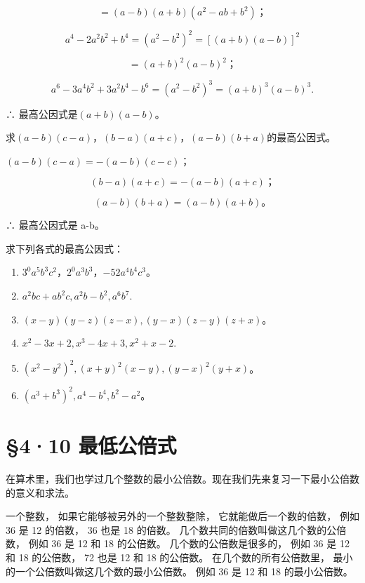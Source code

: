 \[
= (a - b) (a + b) \left(a ^{2} - a b + b ^{2}\right)\text{；}
\]

\[
a ^{4} - 2 a ^{2} b ^{2} + b ^{4} = (a ^{2} - b ^{2}) ^{2} = [ (a + b) (a - b) ] ^{2}
\]

\[
= (a + b) ^{2} (a - b) ^{2}\text{；}
\]

\[
a ^{6} - 3 a ^{4} b ^{2} + 3 a ^{2} b ^{4} - b ^{6} = (a ^{2} - b ^{2}) ^{3} = (a + b) ^{3} (a - b) ^{3}.
\]

∴ 最高公因式是\((a+b)(a-b)\)。

求\((a-b)(c-a)\)，\((b-a)(a+c)\)，\((a-b)(b+a)\)的最高公因式。

\((a - b)(c - a) = -(a - b)(c - c)\)；

\[
(b - a) (a + c) = - (a - b) (a + c)\text{；}
\]

\[
(a - b) (b + a) = (a - b) (a + b)\text{。}
\]

∴ 最高公因式是 a-b。

求下列各式的最高公因式：

\begin{enumerate}[start=1]
\item
  \(3^{0}a^{5}b^{3}c^{2}\)，\(2^{0}a^{3}b^{3}\)，\(-52a^{4}b^{4}c^{3}\)。
\item
  \(a^2 bc + ab^2 c, a^2 b - b^2, a^6 b^7.\)
\item
  \((x - y)(y - z)(z - x), (y - x)(z - y)(z + x)\)。
\item
  \(x^{2} - 3x + 2, x^{3} - 4x + 3, x^{2} + x - 2.\)
\item
  \((x^{2} - y^{2})^{2}, (x + y)^{2}(x - y), (y - x)^{2}(y + x)\)。
\item
  \((a^3 + b^3)^2, a^4 - b^4, b^2 - a^2\)。
\end{enumerate}

\section{§4·10 最低公倍式}

在算术里，我们也学过几个整数的最小公倍数。现在我们先来复习一下最小公倍数的意义和求法。

一个整数， 如果它能够被另外的一个整数整除， 它就能做后一个数的倍数，
例如 36 是 12 的倍数， 36 也是 18 的倍数。
几个数共同的倍数叫做这几个数的公倍数， 例如 36 是 12 和 18 的公倍数。
几个数的公倍数是很多的， 例如 36 是 12 和 18 的公倍数， 72 也是 12 和 18
的公倍数。 在几个数的所有公倍数里，
最小的一个公倍数叫做这几个数的最小公倍数。 例如 36 是 12 和 18
的最小公倍数。

